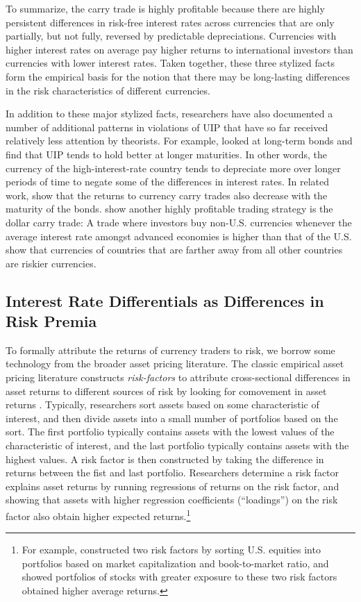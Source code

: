 \documentclass{ar-1col}
\begin{document}
To summarize, the carry trade is highly profitable because there are highly persistent differences in risk-free interest rates across currencies that are only partially, but not fully, reversed by predictable depreciations. Currencies with higher interest rates on average pay higher returns to international investors than currencies with lower interest rates. Taken together, these three stylized facts form the empirical basis for the notion that there may be long-lasting differences in the risk characteristics of different currencies.

In addition to these major stylized facts, researchers have also documented a number of additional patterns in violations of UIP that have so far received relatively less attention by theorists. For example, \citet{ChinnMeredith2004} looked at long-term bonds and find that UIP tends to hold better at longer maturities. In other words, the currency of the high-interest-rate country tends to depreciate more over longer periods of time to negate some of the differences in interest rates. In related work, \citet{LustigStathopoulosVerdelhan2019} show that the returns to currency carry trades also decrease with the maturity of the bonds. \citet{LRV2014} show another highly profitable trading strategy is the dollar carry trade: A trade where investors buy non-U.S. currencies whenever the average interest rate amongst advanced economies is higher than that of the U.S. \citet{LustigRichmond2020} show that currencies of countries that are farther away from all other countries are riskier currencies.



\subsection{Interest Rate Differentials as Differences in Risk Premia \label{sec_RP}}


To formally attribute the returns of currency traders to risk, we borrow some technology from the broader asset pricing literature. The classic empirical asset pricing literature constructs \emph{risk-factors} to attribute cross-sectional differences in asset returns to different sources of risk by looking for comovement in asset returns \citep{Fama1976}. Typically, researchers sort assets based on some characteristic of interest, and then divide assets into a small number of portfolios based on the sort. The first portfolio typically contains assets with the lowest values of the characteristic of interest, and the last portfolio typically contains assets with the highest values. A risk factor is then constructed by taking the difference in returns between the fist and last portfolio. Researchers determine a risk factor explains asset returns by running regressions of returns on the risk factor, and showing that assets with higher regression coefficients (``loadings'') on the risk factor also obtain higher expected returns.\footnote{For example, \citet{FamaFrench1992} constructed two risk factors by sorting U.S. equities into portfolios based on market capitalization and book-to-market ratio, and showed portfolios of stocks with greater exposure to these two risk factors obtained higher average returns.}
\end{document}
